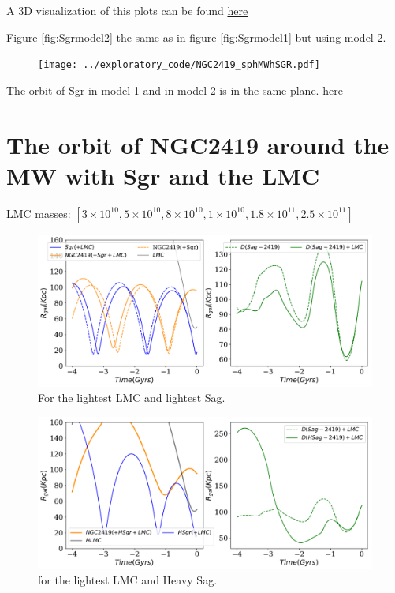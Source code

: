 \documentclass[14pt]{article}
\begin{document}
A 3D visualization of this plots can be found \href{https://plot.ly/~jngc/22/orbits/}{here}

Figure \ref{fig:Sgrmodel2} the same as in figure \ref{fig:Sgrmodel1}
but using model 2.

\begin{figure}[H]
\centering
\texttt{[image: ../exploratory\_code/NGC2419\_sphMWhSGR.pdf]}
\caption{\label{fig:Sgrmmodel2}}
\end{figure}

The orbit of Sgr in model 1 and in model 2 is in the same plane.
\href{https://plot.ly/~jngc/25/orbits/}{here}



\section{The orbit of NGC2419 around the MW with Sgr and the LMC}

LMC masses: $[3\times10^{10}, 5\times10^{10}, 8\times10^{10},
1\times10^{10}, 1.8\times10^{11}, 2.5\times10^{11}]$



\begin{figure}[H]
\centering
\includegraphics[scale=0.5]{../exploratory_code/NGC2419_sphMWSGRLMC.pdf}
\caption{For the lightest LMC and lightest Sag.}
\end{figure}


\begin{figure}[H]
\centering
\includegraphics[scale=0.5]{../exploratory_code/NGC2419_sphMWHSGRLMC.pdf}
\caption{for the lightest LMC and Heavy Sag.}
\end{figure}
\end{document}
